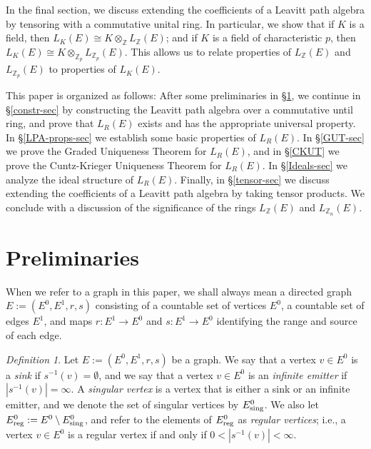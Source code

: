 \documentclass[11pt]{amsart}
\theoremstyle{remark}
\newtheorem{definition}[theorem]{Definition}
\numberwithin{equation}{section}
\newcommand{\Z}{\mathbb{Z}}
\begin{document}
In the final section, we discuss extending the coefficients of a Leavitt path algebra by tensoring with a commutative unital ring.  In particular, we show that if $K$ is a field, then $L_K(E) \cong K \otimes_\Z L_\Z(E)$; and if $K$ is a field of characteristic $p$, then $L_K(E) \cong K \otimes_{\Z_p} L_{\Z_p}(E)$.   This allows us to relate properties of $L_\Z(E)$ and $L_{\Z_p}(E)$ to properties of $L_K(E)$. 


This paper is organized as follows:  After some preliminaries in \S \ref{prelim-sec}, we continue in \S \ref{constr-sec} by constructing the Leavitt path algebra over a commutative until ring, and prove that $L_R(E)$ exists and has the appropriate universal property.  In \S \ref{LPA-props-sec} we establish some basic properties of $L_R(E)$.  In \S \ref{GUT-sec} we prove the Graded Uniqueness Theorem for $L_R(E)$, and in \S \ref{CKUT} we prove the Cuntz-Krieger Uniqueness Theorem for $L_R(E)$.  In \S \ref{Ideals-sec} we analyze the ideal structure of $L_R(E)$.  Finally, in \S \ref{tensor-sec} we discuss extending the coefficients of a Leavitt path algebra by taking tensor products.  We conclude with a discussion of the significance of the rings $L_\Z(E)$ and $L_{\Z_n}(E)$.



\section{Preliminaries} \label{prelim-sec}

When we refer to a graph in this paper, we shall always mean a directed graph $E := (E^0, E^1, r, s)$ consisting of a countable set of vertices $E^0$, a countable set of edges $E^1$, and maps $r: E^1 \to E^0$ and $s:E^1 \to E^0$ identifying the range and source of each edge.

\begin{definition}
Let $E := (E^0, E^1, r, s)$ be a graph.  We say that a vertex $v \in E^0$ is a \emph{sink} if $s^{-1}(v) = \emptyset$, and we say that a vertex $v \in E^0$ is an \emph{infinite emitter} if $|s^{-1}(v)| = \infty$.  A \emph{singular vertex} is a vertex that is either a sink or an infinite emitter, and we denote the set of singular vertices by $E^0_\textnormal{sing}$.  We also let $E^0_\textnormal{reg} := E^0 \setminus E^0_\textnormal{sing}$, and refer to the elements of $E^0_\textnormal{reg}$ as \emph{regular vertices}; i.e., a vertex $v \in E^0$ is a regular vertex if and only if $0 < |s^{-1}(v)| < \infty$.
\end{definition}
\end{document}
